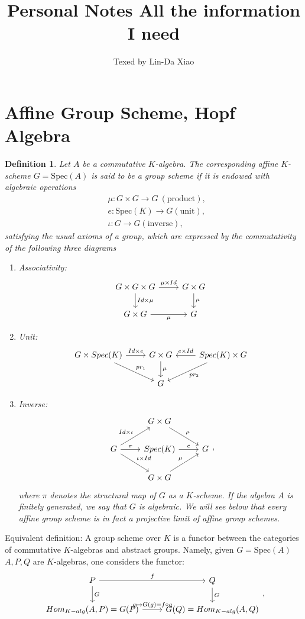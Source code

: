 \documentclass[11pt]{article}
\title{\bf Personal Notes All the information I need}
\author{Texed by Lin-Da Xiao} %
\newtheorem{dfn}[thm]{Definition}
\newcommand{\lrta}{\longrightarrow}
\begin{document}
\maketitle
\tableofcontents
\newpage
\section{Affine Group Scheme, Hopf Algebra}
\begin{dfn}
Let $A$ be a commutative $K$-algebra. The corresponding affine $K$-scheme $G=\text{Spec}(A)$ is said to be a group scheme if it is endowed with algebraic operations
$$
\begin{aligned}
&\mu:G\times G\lrta G\ (\text{product}),\\
&e: \text{Spec}(K)\lrta G (\text{unit}),\\
& \iota: G\lrta G (\text{inverse}),
\end{aligned}
$$
satisfying the usual axioms of a group, which are expressed by the commutativity of the following three diagrams
\begin{enumerate}[label=(\arabic*)]
\item Associativity:
    \[
    \begin{tikzcd}
    G\times G\times G\ar[r,"\mu\times Id"]\ar[d,"Id\times \mu"]& G\times G\ar[d,"\mu"]\\
    G\times G\ar[r,swap,"\mu"] & G
    \end{tikzcd}
    \]

\item Unit:
    \[
    \begin{tikzcd}
    G\times Spec(K)\ar[r,"Id\times e"]\ar[dr,"pr_1"]& G\times G\ar[d,"\mu"]& Spec(K)\times G\ar[l,swap,"e\times Id"]\ar[dl,"pr_2"]\\
     & G &
    \end{tikzcd}
    \]
\item Inverse:
    \[
    \begin{tikzcd}
    & G\times G\ar[dr,"\mu"]& \\
    G\ar[r,"\pi"]\ar[ur,"Id\times\iota"]\ar[dr,"\iota\times Id"]& Spec(K)\ar[r,"e"] &G\\
     & G\times G \ar[ur,"\mu"]&
    \end{tikzcd},
    \]    
    where $\pi $ denotes the structural map of $G$ as a $K$-scheme. If the algebra $A$ is finitely generated, we say that $G$ is algebraic. We will see below that every affine group scheme is in fact a projective limit of affine group schemes. 
\end{enumerate}
\end{dfn}
{\color{red}
Equivalent definition: A group scheme over $K$ is a functor between the categories of commutative $K$-algebras and abstract groups. Namely, given $G=\text{Spec}(A)$ $A,P,Q$ are $K$-algebras, one considers the functor:
    \[
    \begin{tikzcd}
    P\ar[r,"f"]\ar[d,"G"]& Q\ar[d,"G"] \\
    Hom_{K-alg}(A,P)=G(P)\ar[r,"g\mapsto G(g)=f\circ g"] & G(Q)=Hom_{K-alg}(A,Q)
    \end{tikzcd},
    \]}
\end{document}

